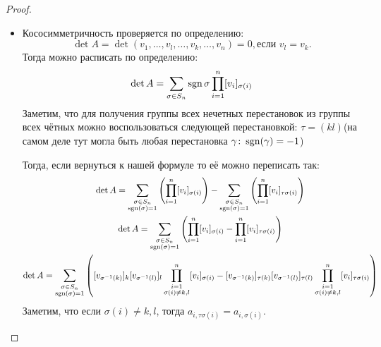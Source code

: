 \begin{proof}
\begin{enumerate}
\begin{itemize}
                \item Кососимметричность проверяется по определению:
                    \[
                    \det A = \det(v_1,\dots, v_l,\dots, v_k,\dots, v_n) = 0, \text{если } v_l = v_k.
                    \]
                    Тогда можно расписать по определению:
                    \[
                        \det A = \sum\limits_{\sigma\in S_n}^{}{\operatorname{sgn}\sigma\prod\limits_{i=1}^{n}[v_i]_{\sigma(i)}}
                    \]
                    Заметим, что для получения группы всех нечетных перестановок из группы всех 
                    чётных можно воспользоваться следующей перестановкой: $\tau=(kl)$(на самом
                    деле тут могла быть любая перестановка $\gamma\colon \operatorname{sgn}(\gamma) = -1$)

                    Тогда, если вернуться к нашей формуле то её можно переписать так:
                    \[
                    \begin{gathered}
                        \det A = 
                        \sum\limits_{\substack{\sigma\in S_n\\\operatorname{sgn}(\sigma)=1}}
                        \left(\prod\limits_{i=1}^{n}[v_i]_{\sigma(i)}\right)
                            - 
                        \sum\limits_{\substack{\sigma\in S_n\\\operatorname{sgn}(\sigma)=1}}
                        \left(\prod\limits_{i=1}^{n}[v_i]_{\tau\sigma(i)}\right)
                        \\
                        \det A = 
                        \sum\limits_{\substack{\sigma\in S_n\\\operatorname{sgn}(\sigma)=1}}
                        \left(\prod\limits_{i=1}^{n}[v_i]_{\sigma(i)}- \prod\limits_{i=1}^{n}[v_i]_{\tau\sigma(i)}\right)
                        \\
                        \det A = 
                        \sum\limits_{\substack{\sigma\in S_n\\\operatorname{sgn}(\sigma)=1}}
                        \left([v_{\sigma^{-1}(k)}]_k [v_{\sigma^{-1}(l)}]_l \prod\limits_{\substack{i=1\\\sigma(i)\not=k,l}}^{n}[v_i]_{\sigma(i)}-
                        [v_{\sigma^{-1}(k)}]_{\tau(k)} [v_{\sigma^{-1}(l)}]_{\tau(l)} \prod\limits_{\substack{i=1\\\sigma(i)\not=k,l}}^{n}[v_i]_{\tau\sigma(i)}\right)
                    \end{gathered}
                    \]
                    Заметим, что если $\sigma(i)\not= k,l$, тогда $a_{i, \tau\sigma(i)} = a_{i,\sigma(i)}$.

\end{itemize}
\end{enumerate}
\end{proof}
